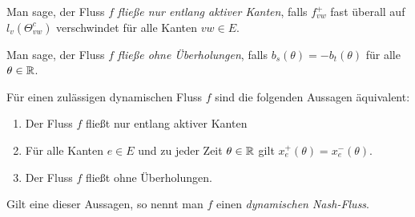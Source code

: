 	\begin{definition}\label{def-flow-along-active-edges}
		Man sage, der Fluss $f$ \emph{fließe nur entlang aktiver Kanten}, falls $f_{vw}^+$ fast überall auf $l_v(\Theta_{vw}^c)$ verschwindet für alle Kanten $vw\in E$.
	\end{definition}
	
	\begin{definition}
		Man sage, der Fluss $f$ \emph{fließe ohne Überholungen}, falls $b_s(\theta) = -b_t(\theta)$ für alle $\theta\in\mathbb{R}$.
	\end{definition}

	\begin{theorem}\label{thm-equivalencies-nash-flow}
		Für einen zulässigen dynamischen Fluss $f$ sind die folgenden Aussagen äquivalent:
		\begin{enumerate}[label=(\roman*)]
			\item Der Fluss $f$ fließt nur entlang aktiver Kanten
			\item Für alle Kanten $e\in E$ und zu jeder Zeit $\theta\in\mathbb{R}$ gilt $x_e^+(\theta) = x_e^-(\theta)$.
			\item Der Fluss $f$ fließt ohne Überholungen.
		\end{enumerate}
		Gilt eine dieser Aussagen, so nennt man $f$ einen \emph{dynamischen Nash-Fluss}.
	\end{theorem}